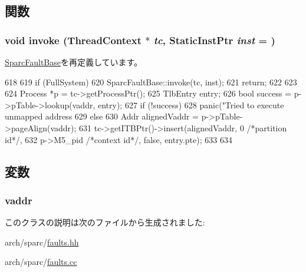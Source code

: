 \subsection{関数}
\hypertarget{classSparcISA_1_1FastInstructionAccessMMUMiss_a2bd783b42262278d41157d428e1f8d6f}{
\subsubsection[{invoke}]{\setlength{\rightskip}{0pt plus 5cm}void invoke ({\bf ThreadContext} $\ast$ {\em tc}, \/  {\bf StaticInstPtr} {\em inst} = {})}}
\label{classSparcISA_1_1FastInstructionAccessMMUMiss_a2bd783b42262278d41157d428e1f8d6f}


\hyperlink{classSparcISA_1_1SparcFaultBase_a2bd783b42262278d41157d428e1f8d6f}{SparcFaultBase}を再定義しています。


\begin{DoxyCode}
618 {
619     if (FullSystem) {
620         SparcFaultBase::invoke(tc, inst);
621         return;
622     }
623 
624     Process *p = tc->getProcessPtr();
625     TlbEntry entry;
626     bool success = p->pTable->lookup(vaddr, entry);
627     if (!success) {
628         panic("Tried to execute unmapped address %
629     } else {
630         Addr alignedVaddr = p->pTable->pageAlign(vaddr);
631         tc->getITBPtr()->insert(alignedVaddr, 0 /*partition id*/,
632                 p->M5_pid /*context id*/, false, entry.pte);
633     }
634 }
\end{DoxyCode}


\subsection{変数}
\hypertarget{classSparcISA_1_1FastInstructionAccessMMUMiss_a9f933b300ef63eea367ca82f8da31025}{
\subsubsection[{vaddr}]{ {\bf vaddr}}}
\label{classSparcISA_1_1FastInstructionAccessMMUMiss_a9f933b300ef63eea367ca82f8da31025}


このクラスの説明は次のファイルから生成されました:\begin{DoxyCompactItemize}
\item 
arch/sparc/\hyperlink{arch_2sparc_2faults_8hh}{faults.hh}\item 
arch/sparc/\hyperlink{arch_2sparc_2faults_8cc}{faults.cc}\end{DoxyCompactItemize}
